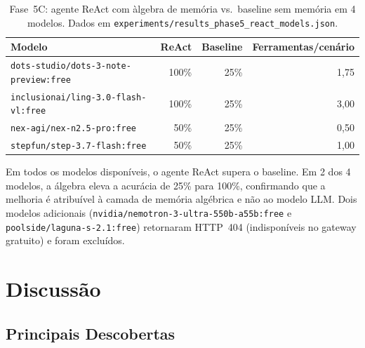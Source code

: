 \documentclass[11pt,a4paper]{article}
\theoremstyle{definition}
\begin{document}
\begin{table}[h]
\centering
\begin{tabular}{lrrr}
\toprule
\textbf{Modelo} & \textbf{ReAct} & \textbf{Baseline} & \textbf{Ferramentas/cen\'ario} \\
\midrule
\texttt{dots-studio/dots-3-note-preview:free} & 100\% & 25\% & 1,75 \\
\texttt{inclusionai/ling-3.0-flash-vl:free} & 100\% & 25\% & 3,00 \\
\texttt{nex-agi/nex-n2.5-pro:free} & 50\% & 25\% & 0,50 \\
\texttt{stepfun/step-3.7-flash:free} & 50\% & 25\% & 1,00 \\
\bottomrule
\end{tabular}
\caption{Fase~5C: agente ReAct com \`algebra de mem\'oria vs.\ baseline sem mem\'oria em 4 modelos. Dados em \texttt{experiments/results\_phase5\_react\_models.json}.}
\end{table}

Em todos os modelos dispon\'iveis, o agente ReAct supera o baseline. Em 2 dos 4 modelos, a \'algebra eleva a acur\'acia de 25\% para 100\%, confirmando que a melhoria \'e atribu\'ivel \`a camada de mem\'oria alg\'ebrica e n\~ao ao modelo LLM. Dois modelos adicionais (\texttt{nvidia/nemotron-3-ultra-550b-a55b:free} e \texttt{poolside/laguna-s-2.1:free}) retornaram HTTP~404 (indispon\'iveis no gateway gratuito) e foram exclu\'idos.

\section{Discuss\~ao}\label{sec:discussao}

\subsection{Principais Descobertas}
\end{document}

